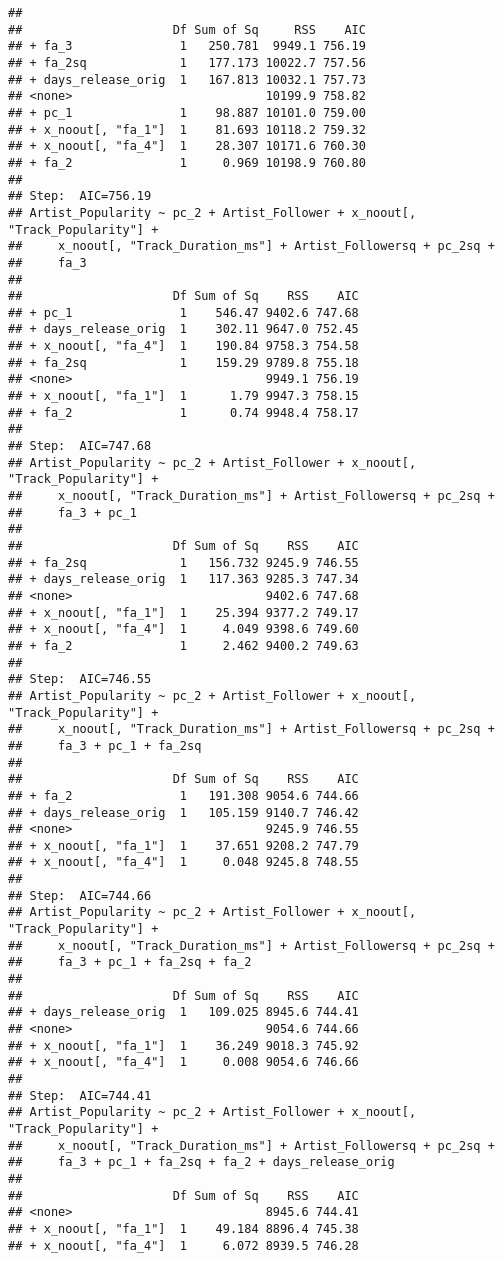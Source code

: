 \documentclass[
]{article}
\begin{document}
\begin{verbatim}
## 
##                     Df Sum of Sq     RSS    AIC
## + fa_3               1   250.781  9949.1 756.19
## + fa_2sq             1   177.173 10022.7 757.56
## + days_release_orig  1   167.813 10032.1 757.73
## <none>                           10199.9 758.82
## + pc_1               1    98.887 10101.0 759.00
## + x_noout[, "fa_1"]  1    81.693 10118.2 759.32
## + x_noout[, "fa_4"]  1    28.307 10171.6 760.30
## + fa_2               1     0.969 10198.9 760.80
## 
## Step:  AIC=756.19
## Artist_Popularity ~ pc_2 + Artist_Follower + x_noout[, "Track_Popularity"] + 
##     x_noout[, "Track_Duration_ms"] + Artist_Followersq + pc_2sq + 
##     fa_3
## 
##                     Df Sum of Sq    RSS    AIC
## + pc_1               1    546.47 9402.6 747.68
## + days_release_orig  1    302.11 9647.0 752.45
## + x_noout[, "fa_4"]  1    190.84 9758.3 754.58
## + fa_2sq             1    159.29 9789.8 755.18
## <none>                           9949.1 756.19
## + x_noout[, "fa_1"]  1      1.79 9947.3 758.15
## + fa_2               1      0.74 9948.4 758.17
## 
## Step:  AIC=747.68
## Artist_Popularity ~ pc_2 + Artist_Follower + x_noout[, "Track_Popularity"] + 
##     x_noout[, "Track_Duration_ms"] + Artist_Followersq + pc_2sq + 
##     fa_3 + pc_1
## 
##                     Df Sum of Sq    RSS    AIC
## + fa_2sq             1   156.732 9245.9 746.55
## + days_release_orig  1   117.363 9285.3 747.34
## <none>                           9402.6 747.68
## + x_noout[, "fa_1"]  1    25.394 9377.2 749.17
## + x_noout[, "fa_4"]  1     4.049 9398.6 749.60
## + fa_2               1     2.462 9400.2 749.63
## 
## Step:  AIC=746.55
## Artist_Popularity ~ pc_2 + Artist_Follower + x_noout[, "Track_Popularity"] + 
##     x_noout[, "Track_Duration_ms"] + Artist_Followersq + pc_2sq + 
##     fa_3 + pc_1 + fa_2sq
## 
##                     Df Sum of Sq    RSS    AIC
## + fa_2               1   191.308 9054.6 744.66
## + days_release_orig  1   105.159 9140.7 746.42
## <none>                           9245.9 746.55
## + x_noout[, "fa_1"]  1    37.651 9208.2 747.79
## + x_noout[, "fa_4"]  1     0.048 9245.8 748.55
## 
## Step:  AIC=744.66
## Artist_Popularity ~ pc_2 + Artist_Follower + x_noout[, "Track_Popularity"] + 
##     x_noout[, "Track_Duration_ms"] + Artist_Followersq + pc_2sq + 
##     fa_3 + pc_1 + fa_2sq + fa_2
## 
##                     Df Sum of Sq    RSS    AIC
## + days_release_orig  1   109.025 8945.6 744.41
## <none>                           9054.6 744.66
## + x_noout[, "fa_1"]  1    36.249 9018.3 745.92
## + x_noout[, "fa_4"]  1     0.008 9054.6 746.66
## 
## Step:  AIC=744.41
## Artist_Popularity ~ pc_2 + Artist_Follower + x_noout[, "Track_Popularity"] + 
##     x_noout[, "Track_Duration_ms"] + Artist_Followersq + pc_2sq + 
##     fa_3 + pc_1 + fa_2sq + fa_2 + days_release_orig
## 
##                     Df Sum of Sq    RSS    AIC
## <none>                           8945.6 744.41
## + x_noout[, "fa_1"]  1    49.184 8896.4 745.38
## + x_noout[, "fa_4"]  1     6.072 8939.5 746.28
\end{verbatim}
\end{document}
